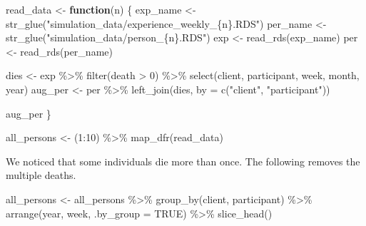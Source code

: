 \documentclass[
]{article}
\newenvironment{Shaded}{\begin{snugshade}}{\end{snugshade}}
\newcommand{\AttributeTok}[1]{\textcolor[rgb]{0.77,0.63,0.00}{#1}}
\newcommand{\ConstantTok}[1]{\textcolor[rgb]{0.00,0.00,0.00}{#1}}
\newcommand{\ControlFlowTok}[1]{\textcolor[rgb]{0.13,0.29,0.53}{\textbf{#1}}}
\newcommand{\DecValTok}[1]{\textcolor[rgb]{0.00,0.00,0.81}{#1}}
\newcommand{\FunctionTok}[1]{\textcolor[rgb]{0.00,0.00,0.00}{#1}}
\newcommand{\NormalTok}[1]{#1}
\newcommand{\OtherTok}[1]{\textcolor[rgb]{0.56,0.35,0.01}{#1}}
\newcommand{\SpecialCharTok}[1]{\textcolor[rgb]{0.00,0.00,0.00}{#1}}
\newcommand{\StringTok}[1]{\textcolor[rgb]{0.31,0.60,0.02}{#1}}
\begin{document}
\begin{Shaded}
\begin{Highlighting}[]
\NormalTok{read\_data }\OtherTok{\textless{}{-}} \ControlFlowTok{function}\NormalTok{(n) \{}
\NormalTok{  exp\_name }\OtherTok{\textless{}{-}} \FunctionTok{str\_glue}\NormalTok{(}\StringTok{"simulation\_data/experience\_weekly\_\{n\}.RDS"}\NormalTok{)}
\NormalTok{  per\_name }\OtherTok{\textless{}{-}} \FunctionTok{str\_glue}\NormalTok{(}\StringTok{"simulation\_data/person\_\{n\}.RDS"}\NormalTok{)}
\NormalTok{  exp }\OtherTok{\textless{}{-}} \FunctionTok{read\_rds}\NormalTok{(exp\_name)}
\NormalTok{  per }\OtherTok{\textless{}{-}} \FunctionTok{read\_rds}\NormalTok{(per\_name)}

\NormalTok{  dies }\OtherTok{\textless{}{-}}
\NormalTok{    exp }\SpecialCharTok{\%\textgreater{}\%}
    \FunctionTok{filter}\NormalTok{(death }\SpecialCharTok{\textgreater{}} \DecValTok{0}\NormalTok{) }\SpecialCharTok{\%\textgreater{}\%}
    \FunctionTok{select}\NormalTok{(client, participant, week, month, year)}
\NormalTok{  aug\_per }\OtherTok{\textless{}{-}}
\NormalTok{    per }\SpecialCharTok{\%\textgreater{}\%}
    \FunctionTok{left\_join}\NormalTok{(dies, }\AttributeTok{by =} \FunctionTok{c}\NormalTok{(}\StringTok{"client"}\NormalTok{, }\StringTok{"participant"}\NormalTok{))}

\NormalTok{  aug\_per}
\NormalTok{\}}

\NormalTok{all\_persons }\OtherTok{\textless{}{-}}\NormalTok{ (}\DecValTok{1}\SpecialCharTok{:}\DecValTok{10}\NormalTok{) }\SpecialCharTok{\%\textgreater{}\%} \FunctionTok{map\_dfr}\NormalTok{(read\_data)}
\end{Highlighting}
\end{Shaded}

We noticed that some individuals die more than once. The following
removes the multiple deaths.

\begin{Shaded}
\begin{Highlighting}[]
\NormalTok{all\_persons }\OtherTok{\textless{}{-}}
\NormalTok{  all\_persons }\SpecialCharTok{\%\textgreater{}\%}
  \FunctionTok{group\_by}\NormalTok{(client, participant) }\SpecialCharTok{\%\textgreater{}\%}
  \FunctionTok{arrange}\NormalTok{(year, week, }\AttributeTok{.by\_group =} \ConstantTok{TRUE}\NormalTok{) }\SpecialCharTok{\%\textgreater{}\%}
  \FunctionTok{slice\_head}\NormalTok{()}
\end{Highlighting}
\end{Shaded}
\end{document}
